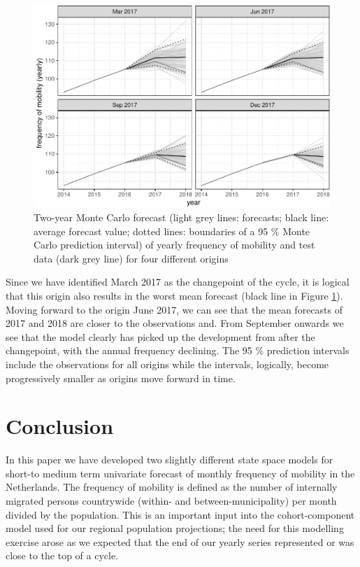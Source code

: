 \documentclass[12pt, a4paper]{article}
\begin{document}
\begin{figure}[H]
  \caption{\label{fig:forecast-2017}Two-year Monte Carlo forecast (light grey lines: forecasts; black line: average forecast value; dotted lines: boundaries of a 95 \% Monte Carlo prediction interval) of yearly frequency of mobility and test data (dark grey line) for four different origins}
\centering
\includegraphics[scale = 0.8]{../figs/freq--mc-intervals-1.pdf}
\end{figure}

Since we have identified March 2017 as the changepoint of the cycle, it is logical that this origin also results in the worst mean forecast (black line in Figure \ref{fig:forecast-2017}).  Moving forward to the origin June 2017, we can see that the mean forecasts of 2017 and 2018 are closer to the observations and. From September onwards we see that the model clearly has picked up the development from after the changepoint, with the annual frequency declining. The 95 \% prediction intervals include the observations for all origins while the intervals, logically, become progressively smaller as origins move forward in time.

\section{Conclusion}\label{conclusion}

In this paper we have developed two slightly different state space models for short-to medium
term univariate forecast of monthly frequency of mobility in the
Netherlands. The frequency of mobility is defined as the number of
internally migrated persons countrywide (within- and
between-municipality) per month divided by the population. This is an
important input into the cohort-component model used for our regional
population projections; the need for this modelling exercise arose as we
expected that the end of our yearly series represented or was close to the top of a
cycle.
\end{document}
